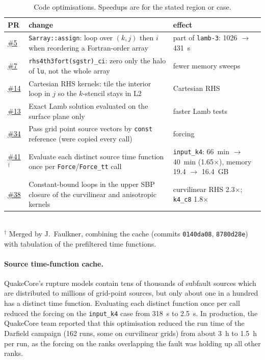 \documentclass[11pt,a4paper]{article}
\newcommand{\pr}[1]{\href{https://github.com/ucgmsim/sw4/pull/#1}{\#{#1}}}
\newcommand{\code}[1]{\texttt{#1}}
\begin{document}
\begin{table}[ht]
  \centering
  \caption{Code optimisations. Speedups are for the stated region or case.}
  \label{tab:opt}
  \small
  \begin{tabularx}{\textwidth}{lX>{\raggedright\arraybackslash}p{5.5cm}}
    \toprule
    PR & change & effect \\
    \midrule
    \pr{5} & \code{Sarray::assign}: loop over $(k,j)$ then $i$ when reordering a Fortran-order array & part of \code{lamb-3}: 1026 $\to$ 431~s \\
    \pr{7} & \code{rhs4th3fort(sgstr)\_ci}: zero only the halo of \code{lu}, not the whole array & fewer memory sweeps \\
    \pr{14} & Cartesian RHS kernels: tile the interior loop in $j$ so the $k$-stencil stays in L2 & Cartesian RHS \\
    \pr{13} & Exact Lamb solution evaluated on the surface plane only & faster Lamb tests \\
    \pr{34} & Pass grid point source vectors by \code{const} reference (were copied every call) & forcing \\
    \pr{41}$^\dagger$ & Evaluate each distinct source time function once per \code{Force}/\code{Force\_tt} call & \code{input\_k4}: 66~min $\to$ 40~min (1.65$\times$), memory 19.4 $\to$ 16.4~GB \\
    \pr{38} & Constant-bound loops in the upper SBP closure of the curvilinear and anisotropic kernels & curvilinear RHS 2.3$\times$; \code{k4\_c8} 1.8$\times$ \\
    \bottomrule
  \end{tabularx}
  \\[0.3em]
  {\footnotesize $^\dagger$ Merged by J.~Faulkner, combining the cache
  (commits \code{0140da08}, \code{8780d28e}) with tabulation of the
  prefiltered time functions.}
\end{table}

\paragraph{Source time-function cache.}
QuakeCore's rupture models contain tens of thousands of subfault sources which
are distributed to millions of grid-point sources, but only about one in a
hundred has a distinct time function. Evaluating each distinct function once
per call reduced the forcing on the \code{input\_k4} case from 318~s to 2.5~s.
In production, the QuakeCore team reported that this optimisation reduced the run time of the
Darfield campaign (162 runs, some on curvilinear grids) from about 3~h to
1.5~h per run, as the forcing on the ranks overlapping the fault was holding
up all other ranks.
\end{document}
